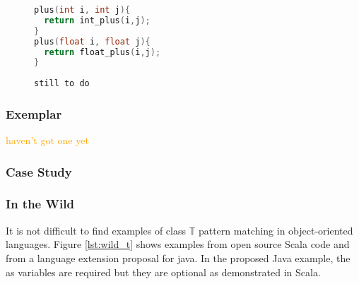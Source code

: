 \documentclass[acmsmall]{acmart}
\renewcommand\todo[1]{\textcolor{orange}{#1}}
\begin{document}
\begin{figure}
\begin{minipage}[t]{0.45\linewidth}
\begin{lstlisting}[language=C]
plus(int i, int j){
  return int_plus(i,j);
}
plus(float i, float j){
  return float_plus(i,j);
}
\end{lstlisting}
\end{minipage}
\begin{minipage}[t]{0.45\linewidth}
\begin{lstlisting}
still to do
\end{lstlisting}
\end{minipage}
\label{fig:kar_switch}
\end{figure}

\subsubsection{Exemplar}

\todo{haven't got one yet}


\subsubsection{Case Study}

\subsubsection{In the Wild}
It is not difficult to find examples of class $\mathbb{T}$ pattern matching in object-oriented languages.  Figure \ref{lst:wild_t} shows examples from open source Scala code and from a language extension proposal\cite{Bierman18} for java.  In the proposed Java example, the as variables are required but they are optional as demonstrated in  Scala.
\end{document}
